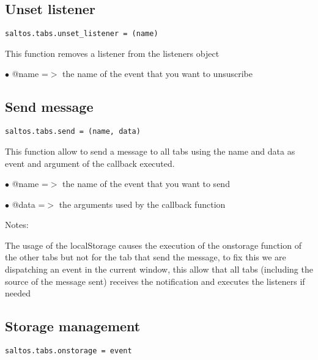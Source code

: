 \documentclass[a4paper]{book}
\begin{document}
\hypertarget{toc423}{}
\subsection{Unset listener}

\begin{lstlisting}
saltos.tabs.unset_listener = (name)
\end{lstlisting}

This function removes a listener from the listeners object

\begin{compactitem}
\item[\color{myblue}$\bullet$] @name =$>$ the name of the event that you want to unsuscribe
\end{compactitem}

\hypertarget{toc424}{}
\subsection{Send message}

\begin{lstlisting}
saltos.tabs.send = (name, data)
\end{lstlisting}

This function allow to send a message to all tabs using the name and data
as event and argument of the callback executed.

\begin{compactitem}
\item[\color{myblue}$\bullet$] @name =$>$ the name of the event that you want to send
\item[\color{myblue}$\bullet$] @data =$>$ the arguments used by the callback function
\end{compactitem}

Notes:

The usage of the localStorage causes the execution of the onstorage function
of the other tabs but not for the tab that send the message, to fix this we
are dispatching an event in the current window, this allow that all tabs
(including the source of the message sent) receives the notification and
executes the listeners if needed

\hypertarget{toc425}{}
\subsection{Storage management}

\begin{lstlisting}
saltos.tabs.onstorage = event
\end{lstlisting}
\end{document}
